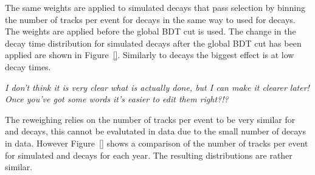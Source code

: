The same weights are applied to simulated \bsmumu decays that pass selection by binning the number of tracks per event for \bsmumu decays in the same way to used for \bdkpi decays. The weights are applied before the global BDT cut is used. The change in the decay time distribution for \bsmuu simulated decays after the global BDT cut has been applied are shown in Figure~\ref{}. Similarly to \bdkpi decays the biggest effect is at low decay times.

{\it I don't think it is very clear what is actually done, but I can make it clearer later! Once you've got some words it's easier to edit them right?!?}

The reweighing relies on the number of tracks per event to be very similar for \bdkpi and \bsmumu decays, this cannot be evalutated in data due to the small number of \bsmumu decays in data. However Figure~\ref{} shows a comparison of the number of tracks per event for simulated \bsmumu and \bdkpi decays for each year. The resulting distributions are rather similar.



